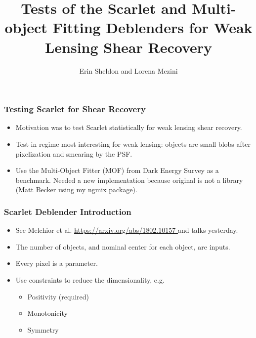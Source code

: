 \documentclass{beamer}
\title{Tests of the Scarlet and Multi-object Fitting Deblenders for
Weak Lensing Shear Recovery}
\author{Erin Sheldon and Lorena Mezini}
\institute{Brookhaven National Laboratory, Stony Brook University}
\begin{document}
\frame{\titlepage}

\frame
{
    \frametitle{Testing Scarlet for Shear Recovery}

    \begin{itemize}

        \item Motivation was to test Scarlet statistically for
            weak lensing shear recovery.
            
        \item Test in regime most interesting for weak lensing:  objects
            are small blobs after pixelization and smearing by the PSF.

        \item Use the Multi-Object Fitter (MOF) from Dark Energy Survey as a
            benchmark.  Needed a new implementation because original is not a
            library (Matt Becker using my ngmix package).

    \end{itemize}

}



\frame
{
    \frametitle{Scarlet Deblender Introduction}

    \begin{itemize}

        \item See Melchior et al. \url{https://arxiv.org/abs/1802.10157 }
            and talks yesterday.

        \item The number of objects, and nominal center for each object, are inputs.

        \item Every pixel is a parameter.


        \item Use constraints to reduce the dimensionality, e.g.
        \begin{itemize}
            \item Positivity (required)
            \item Monotonicity
            \item Symmetry
        \end{itemize}

    \end{itemize}

}
\end{document}
